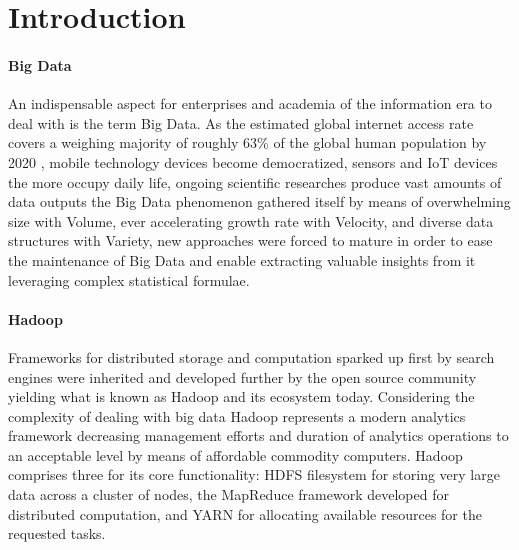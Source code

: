 \documentclass[review]{elsarticle}
\begin{document}
\linenumbers

\section{Introduction}

\paragraph{Big Data}An indispensable aspect for enterprises and academia of the information era to deal with is the term Big Data. As the estimated global internet access rate covers a weighing majority of roughly 63\% of the global human population by 2020 \cite{noauthor_world_nodate}, mobile technology devices become democratized, sensors and IoT devices the more occupy daily life, ongoing scientific researches produce vast amounts of data outputs the Big Data phenomenon gathered itself by means of overwhelming size with Volume, ever accelerating growth rate with Velocity, and diverse data structures with Variety, new approaches were forced to mature in order to ease the maintenance of Big Data and enable extracting valuable insights from it leveraging complex statistical formulae.

\paragraph{Hadoop \cite{noauthor_apache_nodate}}Frameworks for distributed storage and computation sparked up first by search engines were inherited and developed further by the open source community yielding what is known as Hadoop and its ecosystem today. Considering the complexity of dealing with big data Hadoop represents a modern analytics framework decreasing management efforts and duration of analytics operations to an acceptable level by means of affordable commodity computers. Hadoop comprises three for its core functionality: HDFS filesystem for storing very large data across a cluster of nodes, the MapReduce framework developed for distributed computation, and YARN for allocating available resources for the requested tasks.
\end{document}

